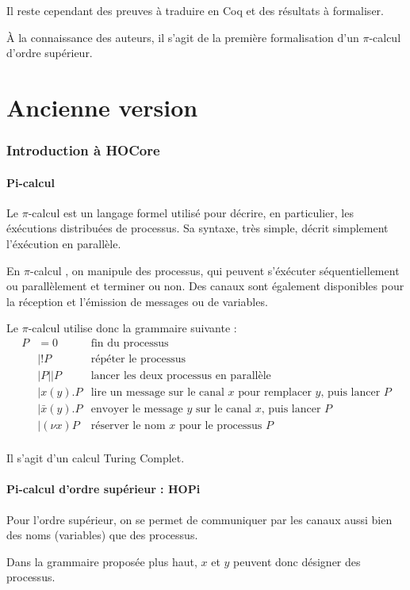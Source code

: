 \documentclass[11pt]{article}
\def\pic{$\pi$-calcul }
\begin{document}
Il reste cependant des preuves à traduire en Coq et des résultats à formaliser.

À la connaissance des auteurs, il s'agit de la première formalisation d'un \pic d'ordre supérieur. 



\newpage
\part*{Ancienne version}
\section{Introduction à HOCore}
\subsection{Pi-calcul}
Le \pic est un langage formel utilisé pour décrire, en particulier, les éxécutions distribuées de processus. Sa syntaxe, très simple, décrit simplement l'éxécution en parallèle.

En \pic, on manipule des processus, qui peuvent s'éxécuter séquentiellement ou parallèlement et terminer ou non. Des canaux sont également disponibles pour la réception et l'émission de messages ou de variables.

Le \pic utilise donc la grammaire suivante :
\begin{align*}
P &= 0 & \text{fin du processus} \\
&| !P &\text{répéter le processus}\\
&| P||P &\text{lancer les deux processus en parallèle}\\
&| x(y).P &\text{lire un message sur le canal $x$ pour remplacer $y$, puis lancer $P$}\\
&| \bar{x}(y).P &\text{envoyer le message $y$ sur le canal $x$, puis lancer $P$}\\
&| (\nu x)P &\text{réserver le nom $x$ pour le processus $P$}\\
\end{align*}

Il s'agit d'un calcul Turing Complet.

\subsection{Pi-calcul d'ordre supérieur : HOPi}
Pour l'ordre supérieur, on se permet de communiquer par les canaux aussi bien des noms (variables) que des processus.

Dans la grammaire proposée plus haut, $x$ et $y$ peuvent donc désigner des processus.
\end{document}
